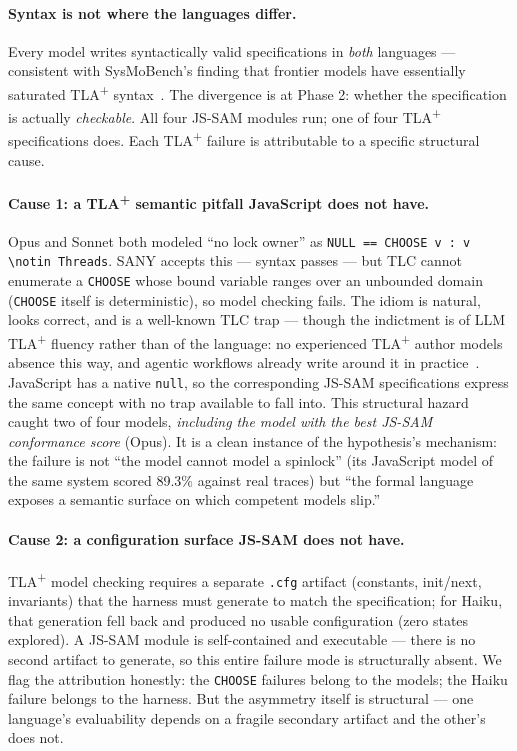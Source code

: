 \documentclass[11pt]{article}
\newcommand{\jssam}{JS-SAM}
\newcommand{\tlaplus}{TLA\texorpdfstring{\textsuperscript{+}}{+}}
\begin{document}
\paragraph{Syntax is not where the languages differ.}
Every model writes syntactically valid specifications in \emph{both}
languages --- consistent with SysMoBench's finding that frontier models have
essentially saturated \tlaplus{} syntax~\cite{sigops2026}. The divergence is
at Phase 2: whether the specification is actually \emph{checkable}. All four
\jssam{} modules run; one of four \tlaplus{} specifications does. Each
\tlaplus{} failure is attributable to a specific structural cause.

\paragraph{Cause 1: a \tlaplus{} semantic pitfall JavaScript does not have.}
Opus and Sonnet both modeled ``no lock owner'' as
\texttt{NULL == CHOOSE v : v \textbackslash notin Threads}. SANY accepts
this --- syntax passes --- but TLC cannot enumerate a \texttt{CHOOSE} whose
bound variable ranges over an unbounded domain (\texttt{CHOOSE} itself is
deterministic), so model checking fails. The idiom is natural, looks
correct, and is a well-known TLC trap --- though the indictment is of LLM
\tlaplus{} fluency rather than of the language: no experienced \tlaplus{}
author models absence this way, and agentic workflows already write around
it in practice~\cite{specula}. JavaScript has a native \texttt{null},
so the corresponding \jssam{} specifications express the same concept with no
trap available to fall into. This structural hazard caught two of four
models, \emph{including the model with the best \jssam{} conformance score}
(Opus). It is a clean instance of the hypothesis's mechanism: the failure is
not ``the model cannot model a spinlock'' (its JavaScript model of the same
system scored 89.3\% against real traces) but ``the formal language exposes a
semantic surface on which competent models slip.''

\paragraph{Cause 2: a configuration surface \jssam{} does not have.}
\tlaplus{} model checking requires a separate \texttt{.cfg} artifact
(constants, init/next, invariants) that the harness must generate to match
the specification; for Haiku, that generation fell back and produced no
usable configuration (zero states explored). A \jssam{} module is
self-contained and executable --- there is no second artifact to generate,
so this entire failure mode is structurally absent. We flag the attribution
honestly: the \texttt{CHOOSE} failures belong to the models; the Haiku
failure belongs to the harness. But the asymmetry itself is structural ---
one language's evaluability depends on a fragile secondary artifact and the
other's does not.
\end{document}
